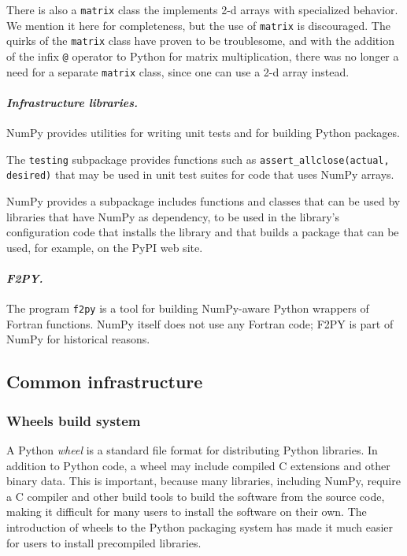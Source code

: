 \documentclass[fleqn,10pt]{wlscirep}
\newcommand{\code}[1]{\texttt{#1}}
\begin{document}
There is also a \code{matrix} class the implements 2-d arrays with
specialized behavior.  We mention it here for completeness, but the
use of \code{matrix} is discouraged.  The quirks of the \code{matrix}
class have proven to be troublesome, and with the addition of the
infix \code{@} operator to Python for matrix multiplication, there was no
longer a need for a separate \code{matrix} class, since one can
use a 2-d array instead.

\paragraph{\emph{Infrastructure libraries.}} NumPy provides utilities
for writing unit tests and for building Python packages.

The \code{testing} subpackage provides functions such as
\code{assert\_allclose(actual, desired)} that may be used in unit
test suites for code that uses NumPy arrays.

NumPy provides a subpackage includes functions and classes
that can be used by libraries that have NumPy as dependency,
to be used in the library's configuration code that installs the
library and that builds a package that can be used, for example,
on the PyPI web site.

\paragraph{\emph{F2PY.}}  The program \code{f2py} is a tool for
building NumPy-aware Python wrappers of Fortran functions.
NumPy itself does not use any Fortran code;  F2PY is part of NumPy
for historical reasons.

\subsection*{Common infrastructure}

\subsubsection*{Wheels build system}

A Python \emph{wheel}\cite{PEP427} is a standard file format for
distributing Python libraries.  In addition to Python code, a
wheel may include compiled C extensions and other binary data.
This is important, because many libraries, including NumPy,
require a C compiler and other build tools to build the software
from the source code, making it difficult for many users to install
the software on their own.  The introduction of wheels to the Python
packaging system has made it much easier for users to install
precompiled libraries.
\end{document}
